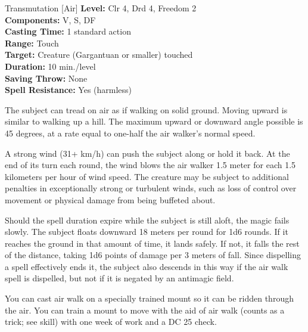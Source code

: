 {Transmutation [Air]}
{
	\textbf{Level:}
	Clr 4, Drd 4, Freedom 2\\
	\textbf{Components:}
	V, S, DF\\
	\textbf{Casting Time:}
	1 standard action\\
	\textbf{Range:}
	Touch\\
	\textbf{Target:}
	Creature (Gargantuan or smaller) touched\\
	\textbf{Duration:}
	10 min./level\\
	\textbf{Saving Throw:}
	None\\
	\textbf{Spell Resistance:}
	Yes (harmless)\\
}
{
	The subject can tread on air as if walking on solid ground. Moving upward is similar to walking up a hill. The maximum upward or downward angle possible is 45 degrees, at a rate equal to one-half the air walker's normal speed.

	A strong wind (31+ km/h) can push the subject along or hold it back. At the end of its turn each round, the wind blows the air walker 1.5 meter for each 1.5 kilometers per hour of wind speed. The creature may be subject to additional penalties in exceptionally strong or turbulent winds, such as loss of control over movement or physical damage from being buffeted about.

	Should the spell duration expire while the subject is still aloft, the magic fails slowly. The subject floats downward 18 meters per round for 1d6 rounds. If it reaches the ground in that amount of time, it lands safely. If not, it falls the rest of the distance, taking 1d6 points of damage per 3 meters of fall. Since dispelling a spell effectively ends it, the subject also descends in this way if the air walk spell is dispelled, but not if it is negated by an antimagic field.

	You can cast air walk on a specially trained mount so it can be ridden through the air. You can train a mount to move with the aid of air walk (counts as a trick; see  skill) with one week of work and a DC 25  check.

}
